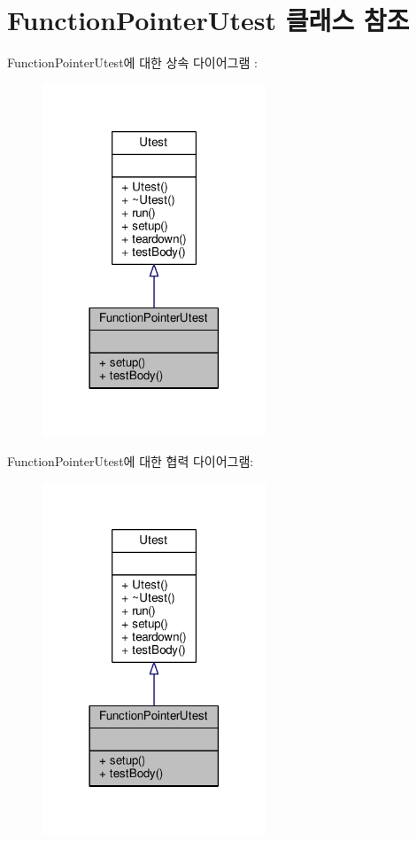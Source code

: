 \hypertarget{class_function_pointer_utest}{}\section{Function\+Pointer\+Utest 클래스 참조}
\label{class_function_pointer_utest}


Function\+Pointer\+Utest에 대한 상속 다이어그램 \+: 
\nopagebreak
\begin{figure}[H]
\begin{center}
\leavevmode
\includegraphics[width=189pt]{class_function_pointer_utest__inherit__graph}
\end{center}
\end{figure}


Function\+Pointer\+Utest에 대한 협력 다이어그램\+:
\nopagebreak
\begin{figure}[H]
\begin{center}
\leavevmode
\includegraphics[width=189pt]{class_function_pointer_utest__coll__graph}
\end{center}
\end{figure}
